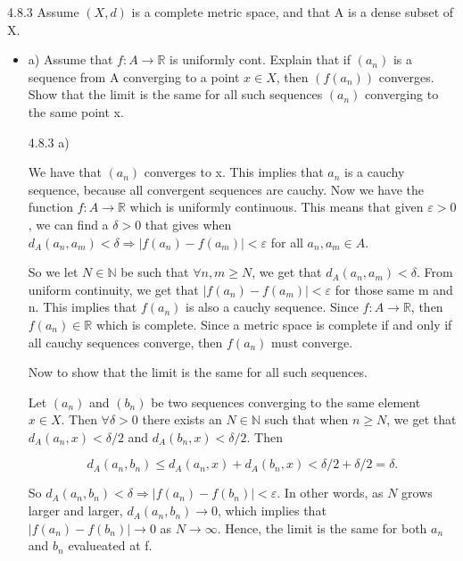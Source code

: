 \documentclass[a4paper,norsk]{article}
\renewcommand{\geq}{\geqslant}
\renewcommand{\leq}{\leqslant}
\renewcommand{\epsilon}{\varepsilon}
\begin{document}
\begin{oppgavebox}{4.8.3}{}
Assume $ \left( X, d \right)  $ is a complete metric space, and that A is a dense subset of X. 

\begin{itemize}
  \item a) Assume that $ f : A \to \mathbb{R} $ is uniformly cont. Explain that if $ \left( a_n \right)  $ is a sequence from A converging to a point $ x \in X $, then $ \left( f(a_n) \right)  $ converges. Show that the limit is the same for all such sequences $ \left( a_n \right)  $ converging to the same point x.
  
  \begin{proofbox}{4.8.3 a)}{}

    We have that $ \left( a_n \right)  $ converges to x. This implies that $ a_n $ is a cauchy sequence, because all convergent sequences are cauchy. Now we have the function $ f : A \to \mathbb{R} $ which is uniformly continuous. This means that given $ \epsilon > 0 $, we can find a $ \delta > 0 $ that gives when $ d_A \left( a_n, a_m \right) < \delta  \Rightarrow \left| f(a_n) - f(a_m) \right| < \epsilon   $ for all $ a_n, a_m \in A$. 



    So we let $ N \in \mathbb{N} $  be such that $ \forall n, m \geq N $, we get that $ d_A \left( a_n, a_m \right)  < \delta  $. From uniform continuity, we get that $ \left| f(a_n) - f(a_m) \right| < \epsilon   $ for those same m and n. This implies that $ f \left( a_n \right)  $ is also a cauchy sequence. Since $ f : A \to \mathbb{R} $, then $ f(a_n) \in \mathbb{R} $ which is complete. Since a metric space is complete if and only if all cauchy sequences converge, then $ f(a_n) $ must converge.

    

    Now to show that the limit is the same for all such sequences. 


    Let $ \left( a_n \right)  $ and $ \left( b_n \right)  $ be two sequences converging to the same element $ x \in X $. Then $ \forall \delta > 0 $ there exists an $ N \in \mathbb{N} $ such that when $ n \geq N $, we get that $ d_A \left( a_n, x \right) < \delta / 2  $ and $ d_A \left( b_n, x \right) < \delta  / 2  $. Then 

    \[
        d_A \left( a_n, b_n \right) \leq  d_A \left( a_n, x \right) + d_A \left( b_n, x \right) < \delta /2 + \delta /2 = \delta.
    \]

    So $ d_A \left( a_n, b_n \right) < \delta \Rightarrow \left| f(a_n) - f(b_n) \right| < \epsilon   $. In other words, as $ N $ grows larger and larger, $ d_A \left( a_n, b_n \right) \to 0  $, which implies that $ \left| f(a_n) - f(b_n) \right| \to 0  $ as $ N \to \infty $. Hence, the limit is the same for both $ a_n $ and $ b_n $ evalueated at f.
    

\end{proofbox}
\end{itemize}
\end{oppgavebox}
\end{document}
